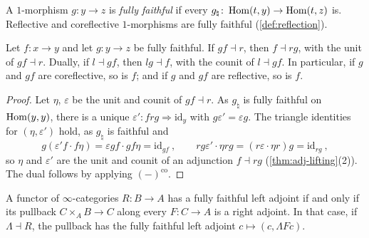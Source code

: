 %
A $1$-morphism $g\colon y \to z$ is \emph{fully faithful} if every
$g_{\natural}\colon \operatorname{Hom}(t,y) \to \operatorname{Hom}(t,z)$
is. Reflective and coreflective $1$-morphisms are fully faithful
(\cref{def:reflection}).

\begin{lem}[cancellation]
\label{lem:ff-cancel}
%
Let $f\colon x \to y$ and let $g\colon y \to z$ be fully faithful.
If $gf \dashv r$, then $f \dashv rg$, with the unit of $gf \dashv r$. Dually,
if $l \dashv gf$, then $lg \dashv f$, with the counit of $l \dashv gf$.
In particular, if $g$ and $gf$ are coreflective, so is $f$;
and if $g$ and $gf$ are reflective, so is $f$.
\end{lem}


\begin{proof}
%
Let $\eta$, $\varepsilon$ be the unit and counit of $gf \dashv r$.
As $g_{\natural}$ is fully faithful on $\operatorname{Hom}(y,y)$, there is a unique
$\varepsilon'\colon frg \Rightarrow \mathrm{id}_{y}$
with
$g\varepsilon' = \varepsilon g$.
The triangle identities for $(\eta,\varepsilon')$ hold,
as $g_{\natural}$ is faithful and
\begin{equation*}
g(\varepsilon'f \cdot f\eta) = \varepsilon gf \cdot gf\eta = \mathrm{id}_{gf}
\ , \qquad rg\varepsilon' \cdot \eta rg = (r\varepsilon \cdot \eta r)g =
\mathrm{id}_{rg} \ ,
\end{equation*}
so $\eta$ and $\varepsilon'$ are the unit and counit of an adjunction $f \dashv
rg$ (\cref{thm:adj-lifting}(2)).
The dual follows by applying $(-)^{\mathrm{co}}$.
\end{proof}

\begin{lem}
\label{lem:corefl-pullback}
%
A functor of $\infty$-categories $R\colon B \to A$ has a fully faithful left
adjoint if and only if its pullback $C \times_{A} B \to C$ along every $F\colon
C \to A$ is a right adjoint. In that case, if $\Lambda \dashv R$,
the pullback has the fully faithful left adjoint
$c \mapsto (c,\Lambda Fc)$.
\end{lem}

